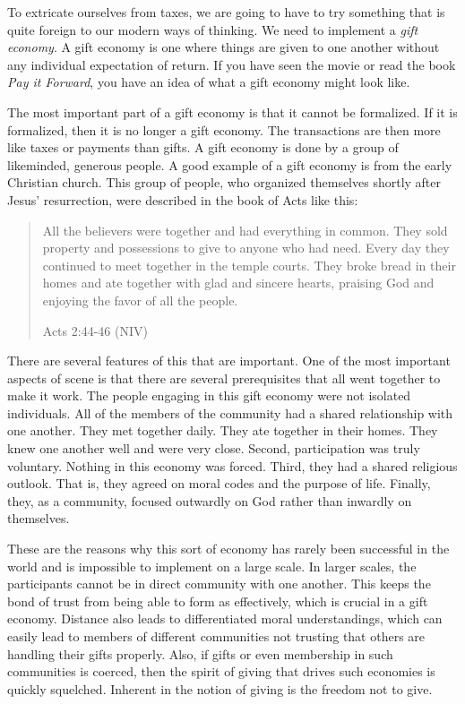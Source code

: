 To extricate ourselves from taxes, we are going to have to try something
that is quite foreign to our modern ways of thinking. We need to
implement a \textit{gift economy}. A gift economy is one where things are given
to one another without any individual expectation of return. If you
have seen the movie or read the book \textit{Pay it Forward}, you have
an idea of what a gift economy might look like.

The most important part of a gift economy is that it cannot be
formalized. If it is formalized, then it is no longer a gift economy.
The transactions are then more like taxes or payments than gifts. A
gift economy is done by a group of likeminded, generous people. A good
example of a gift economy is from the early Christian church. This
group of people, who organized themselves shortly after Jesus’
resurrection, were described in the book of Acts like this:

\begin{quote}
All the believers were together and had everything in common. They sold
property and possessions to give to anyone who had need. Every day they
continued to meet together in the temple courts. They broke bread in
their homes and ate together with glad and sincere hearts, praising God
and enjoying the favor of all the people. 

Acts 2:44-46 (NIV)
\end{quote}

There are several features of this that are important. One of the most
important aspects of scene is that there are several prerequisites that all went
together to make it work. The people engaging in this gift economy were
not isolated individuals. All of the members of the community had a
shared relationship with one another. They met together daily. They ate
together in their homes. They knew one another well and were very
close. Second, participation was truly voluntary. Nothing in this
economy was forced. Third, they had a shared religious outlook. That
is, they agreed on moral codes and the purpose of life. Finally, they,
as a community, focused outwardly on God rather than inwardly on
themselves.

These are the reasons why this sort of economy has rarely been
successful in the world and is impossible to implement on a large
scale. In larger scales, the participants cannot be in direct community
with one another. This keeps the bond of trust from being able to form
as effectively, which is crucial in a gift economy. Distance
also leads to differentiated moral understandings, which can easily
lead to members of different communities not trusting that
others are handling
their gifts properly. Also, if gifts or even membership in such
communities is coerced, then the spirit of giving that drives such
economies is quickly squelched. Inherent in the notion of giving is the
freedom not to give.

